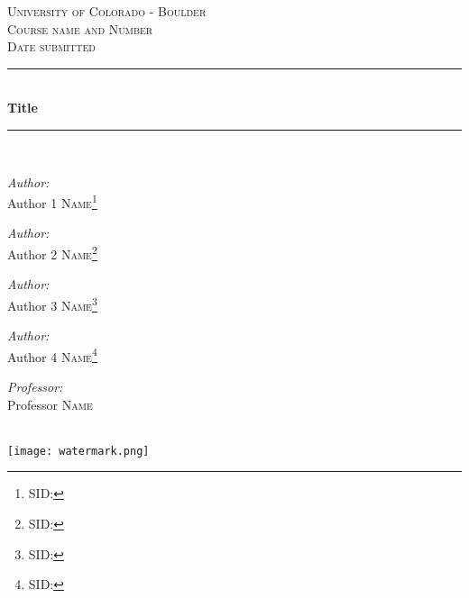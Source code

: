 \documentclass[conf]{new-aiaa}
\begin{document}
\begin{titlepage}

\newcommand{\HRule}{\rule{\linewidth}{0.48mm}}

\center
 
\textsc{\LARGE University of Colorado - Boulder}\\[1cm]
\textsc{\Large Course name and Number}\\[0.5cm] %
\textsc{\large Date submitted}\\[0.5cm] %

\HRule \\[0.4cm]
{ \huge \bfseries  Title}\\[0.4cm] 
\HRule \\[0.75cm]

\begin{minipage}{0.26\textwidth}
\begin{flushleft} \large
\emph{Author:}\\
Author 1 \textsc{Name}\footnote{SID:}
\end{flushleft}
\begin{flushleft} \large
\emph{Author:}\\
Author 2 \textsc{Name}\footnote{SID:}
\end{flushleft}
\begin{flushleft} \large
\emph{Author:}\\
Author 3 \textsc{Name}\footnote{SID:}
\end{flushleft}
\begin{flushleft} \large
\emph{Author:}\\
Author 4 \textsc{Name}\footnote{SID:}
\end{flushleft}

\end{minipage}
\begin{minipage}{0.3\textwidth}
\begin{flushright} \large
\emph{Professor:} \\
Professor \textsc{Name} 
\end{flushright}
\end{minipage}\\[2cm]

\texttt{[image: watermark.png]}\\
 
\vfill

\begin{abstract}

\end{abstract}
\end{titlepage}
\end{document}
